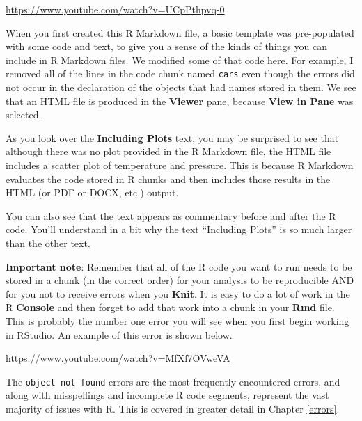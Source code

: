 \documentclass[]{tufte-book}
\begin{document}
\vspace{0.1in}\begin{center}\footnotesize{\url{https://www.youtube.com/watch?v=UCpPthpvq-0}}\end{center}\vspace{0.1in}

When you first created this R Markdown file, a basic template was pre-populated with some code and text, to give you a sense of the kinds of things you can include in R Markdown files. We modified some of that code here. For example, I removed all of the lines in the code chunk named \texttt{cars} even though the errors did not occur in the declaration of the objects that had names stored in them. We see that an HTML file is produced in the \textbf{Viewer} pane, because \textbf{View in Pane} was selected.

As you look over the \textbf{Including Plots} text, you may be surprised to see that although there was no plot provided in the R Markdown file, the HTML file includes a scatter plot of temperature and pressure. This is because R Markdown evaluates the code stored in R chunks and then includes those results in the HTML (or PDF or DOCX, etc.) output.

You can also see that the text appears as commentary before and after the R code. You'll understand in a bit why the text ``Including Plots'' is so much larger than the other text.

\textbf{Important note}: Remember that all of the R code you want to run needs to be stored in a chunk (in the correct order) for your analysis to be reproducible AND for you not to receive errors when you \textbf{Knit}. It is easy to do a lot of work in the R \textbf{Console} and then forget to add that work into a chunk in your \textbf{Rmd} file. This is probably the number one error you will see when you first begin working in RStudio. An example of this error is shown below.

\vspace{0.1in}\begin{center}\footnotesize{\url{https://www.youtube.com/watch?v=MfXf7OVweVA}}\end{center}\vspace{0.1in}

The \texttt{object\ not\ found} errors are the most frequently encountered errors, and along with misspellings and incomplete R code segments, represent the vast majority of issues with R. This is covered in greater detail in Chapter \ref{errors}.
\end{document}
